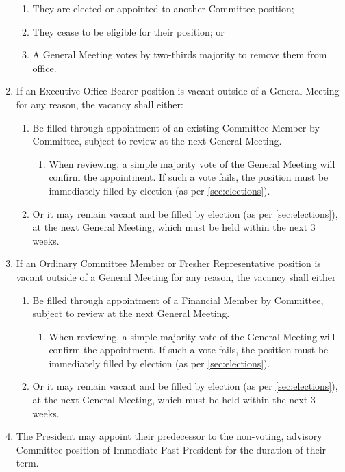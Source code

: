 \documentclass[a4paper]{article}
\begin{document}
\begin{enumerate}
\begin{enumerate}
        \item They are elected or appointed to another Committee position;
        \item They cease to be eligible for their position; or
        \item A General Meeting votes by two-thirds majority to remove them from office.
    \end{enumerate}
    \item If an Executive Office Bearer position is vacant outside of a General Meeting for any reason, the vacancy shall either:
    \begin{enumerate}
        \item Be filled through appointment of an existing Committee Member by Committee, subject to review at the next General Meeting.
        \begin{enumerate}
            \item When reviewing, a simple majority vote of the General Meeting will confirm the appointment. If such a vote fails, the position must be immediately filled by election (as per \cref{sec:elections}).
        \end{enumerate}
        \item Or it may remain vacant and be filled by election (as per \cref{sec:elections}), at the next General Meeting, which must be held within the next 3 weeks.
    \end{enumerate}
    \item If an Ordinary Committee Member or Fresher Representative position is vacant outside of a General Meeting for any reason, the vacancy shall either
    \begin{enumerate}
        \item Be filled through appointment of a Financial Member by Committee, subject to review at the next General Meeting.
        \begin{enumerate}
            \item When reviewing, a simple majority vote of the General Meeting will confirm the appointment. If such a vote fails, the position must be immediately filled by election (as per \cref{sec:elections}).
        \end{enumerate}
        \item Or it may remain vacant and be filled by election (as per \cref{sec:elections}), at the next General Meeting, which must be held within the next 3 weeks.
    \end{enumerate}
    \item The President may appoint their predecessor to the non-voting, advisory Committee position of Immediate Past President for the duration of their term.
\end{enumerate}
\end{document}
